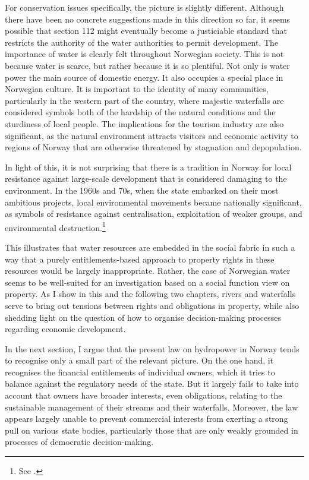 For conservation issues specifically, the picture is slightly different. Although there have been no concrete suggestions  made in this direction so far, it seems possible that section 112 might eventually become a justiciable standard that restricts the authority of the water authorities to permit development. The importance of water is clearly felt throughout Norwegian society. This is not because water is scarce, but rather because it is so plentiful. Not only is water power the main source of domestic energy. It also occupies a special place in Norwegian culture. It is important to the identity of many communities, particularly in the western part of the country, where majestic waterfalls are considered symbols both of the hardship of the natural conditions and the sturdiness of local people. The implications for the tourism industry are also significant, as the natural environment attracts visitors and economic activity to regions of Norway that are otherwise threatened by stagnation and depopulation.

In light of this, it is not surprising that there is a tradition in Norway for local resistance against large-scale development that is considered damaging to the environment. In the 1960s and 70s, when the state embarked on their most ambitious projects, local environmental movements became nationally significant, as symbols of resistance against centralisation, exploitation of weaker groups, and environmental destruction.\footnote{See \cite{nilsen08}.}

This illustrates that water resources are embedded in the social fabric in such a way that a purely entitlements-based approach to property rights in these resources would be largely inappropriate. Rather, the case of Norwegian water seems to be well-suited for an investigation based on a social function view on property. As I show in this and the following two chapters, rivers and waterfalls serve to bring out tensions between rights and obligations in property, while also shedding light on the question of how to organise decision-making processes regarding economic development.

In the next section, I argue that the present law on hydropower in Norway tends to recognise only a small part of the relevant picture. On the one hand, it recognises the financial entitlements of individual owners, which it tries to balance against the regulatory needs of the state. But it largely fails to take into account that owners have broader interests, even obligations, relating to the sustainable management of their streams and their waterfalls. Moreover, the law appears largely unable to prevent commercial interests from exerting a strong pull on various state bodies, particularly those that are only weakly grounded in processes of democratic decision-making.

